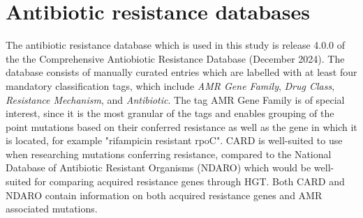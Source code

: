 \section{Antibiotic resistance databases}
The antibiotic resistance database which is used in this study is release 4.0.0 of the the Comprehensive Antiobiotic Resistance Database (December 2024)\cite{alcock2023CARD2023Expanded}.
The database consists of manually curated entries which are labelled with at least four mandatory classification tags, which include \emph{AMR Gene Family}, \emph{Drug Class}, \emph{Resistance Mechanism}, and \emph{Antibiotic}\cite{alcock2020CARD2020Antibiotic}. 
The tag AMR Gene Family is of special interest, since it is the most granular of the tags and enables grouping of the point mutations based on their conferred resistance as well as the gene in which it is located, for example "rifampicin resistant rpoC". 
CARD is well-suited to use when researching mutations conferring resistance, compared to the National Database of Antibiotic Resistant Organisms (NDARO)\cite{feldgarden2021AMRFinderPlusReferenceGene} which would be well-suited for comparing acquired resistance genes through HGT. Both CARD and NDARO contain information on both acquired resistance genes and AMR associated mutations. 



